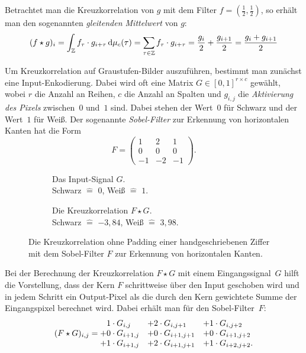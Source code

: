 \documentclass[paper=a4, 	%
		fontsize=11pt,
		abstract=true, 	%
		headsepline, 	%
		notitlepage	%
		]{scrartcl}
\theoremstyle{definition}
\newcommand{\Z}{\mathbb{Z}}
\newcommand{\diff}{\,\textrm{d}}
\begin{document}
Betrachtet man die Kreuzkorrelation von $g$ mit dem Filter $f=(\frac{1}{2}, \frac{1}{2})$, so erhält man den sogenannten \emph{gleitenden Mittelwert} von $g$:
\[  
    (f \star g)_i = \int_\Z f_\tau \cdot g_{i + \tau} \diff \cmeasure(\tau) 
    = \sum_{\tau\in\Z} f_\tau \cdot g_{i+ \tau}
    = \frac{g_i}{2} + \frac{g_{i+1}}{2} = \frac{g_i + g_{i+1}}{2}
\]

Um Kreuzkorrelation auf Graustufen-Bilder auszuführen, bestimmt man zu\-nächst eine Input-Enkodierung.
Dabei wird oft eine Matrix $G\in[0,1]^{r\times c}$ gewählt, wobei $r$ die Anzahl an Reihen, $c$ die Anzahl an Spalten und $g_{i,j}$ die \emph{Aktivierung des Pixels} zwischen~$0$ und~$1$ sind.
Dabei stehen der Wert~$0$ für Schwarz und der Wert~$1$ für Weiß.
Der sogenannte \emph{Sobel-Filter} zur Erkennung von horizontalen Kanten hat die Form
\[
    F = \begin{pmatrix}
        1 & 2 & 1 \\
        0 & 0 & 0 \\ 
        -1 & -2 & -1
    \end{pmatrix}.
\]


\begin{figure}
    \centering
    \begin{subfigure}{0.4\textwidth}
        \resizebox{\textwidth}{\textwidth}{
        
        }
        \caption{Das Input-Signal $G$.\\Schwarz $\hat=$ $0$, Weiß $\hat=$ $1$.}
    \end{subfigure}%
    \begin{subfigure}{0.4\textwidth}
        \resizebox{0.9285\textwidth}{0.9285\textwidth}{
        
        }
    \caption{Die Kreuzkorrelation $F\star G$.\\Schwarz $\hat=$ $-3{,}84$, Weiß $\hat=$ $3{,}98$.}
    \end{subfigure}
    \caption{Die Kreuzkorrelation ohne Padding einer handgeschriebenen Ziffer mit dem Sobel-Filter $F$ zur Erkennung von horizontalen Kanten.}
    \label{fig:sobel-on-mnist}
\end{figure}

Bei der Berechnung der Kreuzkorrelation $F\star G$ mit einem Eingangssignal~$G$ hilft die Vorstellung, dass der Kern $F$ schrittweise über den Input geschoben wird und in jedem Schritt ein Output-Pixel als die durch den Kern gewichtete Summe der Eingangspixel berechnet wird.
Dabei erhält man für den Sobel-Filter~$F$:
\[
(F\star G)_{i,j} = \begin{matrix*}[l]
    \hphantom{+}1\cdot G_{i,j}  & + 2\cdot G_{i, j+1} & + 1\cdot G_{i, j+2} \\
    + 0\cdot G_{i+1, j} &+ 0\cdot G_{i+1, j+1} &+ 0\cdot G_{i+1, j+2} \\
    +1\cdot G_{i+1, j} &+ 2\cdot G_{i+1, j+1} &+ 1\cdot G_{i+2, j+2}.
    \end{matrix*}
\]
\end{document}
